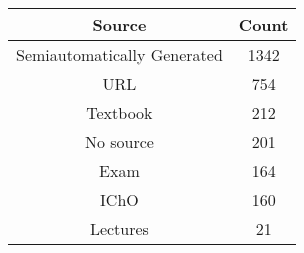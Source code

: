 \begin{tabular}{cc}
\toprule
Source & Count \\
\midrule
Semiautomatically Generated & 1342 \\
URL & 754 \\
Textbook & 212 \\
No source & 201 \\
Exam & 164 \\
IChO & 160 \\
Lectures & 21 \\
\bottomrule
\end{tabular}
